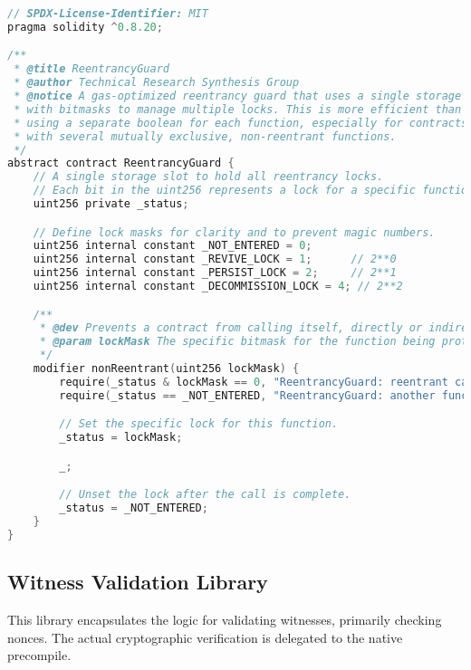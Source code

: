 \documentclass{article}
\begin{document}
\begin{lstlisting}[language=C,caption={ReentrancyGuard.sol - Gas-Optimized Reentrancy Protection},label={lst:reentrancy}]
// SPDX-License-Identifier: MIT
pragma solidity ^0.8.20;

/**
 * @title ReentrancyGuard
 * @author Technical Research Synthesis Group
 * @notice A gas-optimized reentrancy guard that uses a single storage slot
 * with bitmasks to manage multiple locks. This is more efficient than
 * using a separate boolean for each function, especially for contracts
 * with several mutually exclusive, non-reentrant functions.
 */
abstract contract ReentrancyGuard {
    // A single storage slot to hold all reentrancy locks.
    // Each bit in the uint256 represents a lock for a specific function.
    uint256 private _status;

    // Define lock masks for clarity and to prevent magic numbers.
    uint256 internal constant _NOT_ENTERED = 0;
    uint256 internal constant _REVIVE_LOCK = 1;      // 2**0
    uint256 internal constant _PERSIST_LOCK = 2;     // 2**1
    uint256 internal constant _DECOMMISSION_LOCK = 4; // 2**2

    /**
     * @dev Prevents a contract from calling itself, directly or indirectly.
     * @param lockMask The specific bitmask for the function being protected.
     */
    modifier nonReentrant(uint256 lockMask) {
        require(_status & lockMask == 0, "ReentrancyGuard: reentrant call");
        require(_status == _NOT_ENTERED, "ReentrancyGuard: another function is active");

        // Set the specific lock for this function.
        _status = lockMask;

        _;

        // Unset the lock after the call is complete.
        _status = _NOT_ENTERED;
    }
}
\end{lstlisting}

\subsection{Witness Validation Library}

This library encapsulates the logic for validating witnesses, primarily checking nonces. The actual cryptographic verification is delegated to the native precompile.
\end{document}
